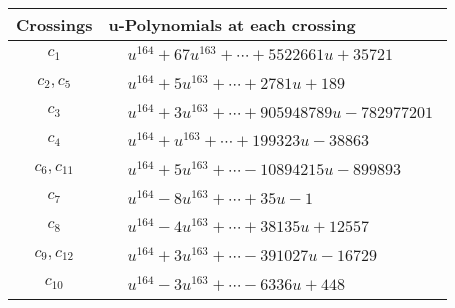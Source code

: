 \documentclass[1p]{elsarticle_modified}
\theoremstyle{definition}
\begin{document}
\begin{tabular}{m{50pt}|m{274pt}}
Crossings & \hspace{64pt}u-Polynomials at each crossing \\
\hline $$\begin{aligned}c_{1}\end{aligned}$$&$\begin{aligned}
&u^{164}+67 u^{163}+\cdots+5522661 u+35721
\end{aligned}$\\
\hline $$\begin{aligned}c_{2},c_{5}\end{aligned}$$&$\begin{aligned}
&u^{164}+5 u^{163}+\cdots+2781 u+189
\end{aligned}$\\
\hline $$\begin{aligned}c_{3}\end{aligned}$$&$\begin{aligned}
&u^{164}+3 u^{163}+\cdots+905948789 u-782977201
\end{aligned}$\\
\hline $$\begin{aligned}c_{4}\end{aligned}$$&$\begin{aligned}
&u^{164}+u^{163}+\cdots+199323 u-38863
\end{aligned}$\\
\hline $$\begin{aligned}c_{6},c_{11}\end{aligned}$$&$\begin{aligned}
&u^{164}+5 u^{163}+\cdots-10894215 u-899893
\end{aligned}$\\
\hline $$\begin{aligned}c_{7}\end{aligned}$$&$\begin{aligned}
&u^{164}-8 u^{163}+\cdots+35 u-1
\end{aligned}$\\
\hline $$\begin{aligned}c_{8}\end{aligned}$$&$\begin{aligned}
&u^{164}-4 u^{163}+\cdots+38135 u+12557
\end{aligned}$\\
\hline $$\begin{aligned}c_{9},c_{12}\end{aligned}$$&$\begin{aligned}
&u^{164}+3 u^{163}+\cdots-391027 u-16729
\end{aligned}$\\
\hline $$\begin{aligned}c_{10}\end{aligned}$$&$\begin{aligned}
&u^{164}-3 u^{163}+\cdots-6336 u+448
\end{aligned}$\\
\hline
\end{tabular}\\~\\
\end{document}
